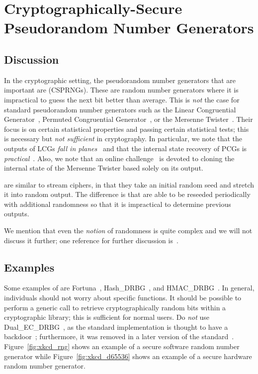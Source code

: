 \section{Cryptographically-Secure Pseudorandom Number Generators}
\label{sec:csprng}

\subsection{Discussion}

In the cryptographic setting, the pseudorandom number generators
that are important are
\emph{}
(CSPRNGs).
These are random number generators where it is impractical
to guess the next bit better than average.
This is \emph{not} the case for standard pseudorandom number generators
such as the Linear Congruential Generator~\cite[Chapter 3.2.1]{TAOCP2},
Permuted Congruential Generator~\cite{PCG2014},
or the Mersenne Twister~\cite{matsumoto1998mersenne}.
Their focus is on certain statistical properties and passing
certain statistical tests;
this is necessary but \emph{not sufficient} in cryptography.
In particular, we note that the outputs of LCGs
\emph{fall in planes}~\cite{marsaglia1968random}
and that the internal state recovery of PCGs
is \emph{practical}~\cite{bouillaguet2020practical}.
Also, we note that an online challenge~\cite{CryptoPals23}
is devoted to cloning the internal state of the Mersenne Twister
based solely on its output.

 are similar to \glspl{stream cipher}, in that they take
an initial random seed and stretch it into random output.
The difference is that  are able to be reseeded
periodically with additional randomness
so that it is impractical to determine previous outputs.

We mention that even the \emph{notion} of randomness is quite complex
and we will not discuss it further;
one reference for further discussion is~\cite[Chapter 3.5]{TAOCP2}.

\subsection{Examples}

Some examples of  are
Fortuna~\cite[Chapter 10]{PracticalCryptography}\cite[Chapter 9]{CryptoEng},
Hash\_DRBG~\cite[Section~10.1.1]{NIST-SP-800-90ARev1},
and HMAC\_DRBG~\cite[Section~10.1.2]{NIST-SP-800-90ARev1}.
In general, individuals should not worry about specific
 functions.
It should be possible to perform a generic call to retrieve
cryptographically random bits within a cryptographic library;
this is sufficient for normal users.
Do \emph{not} use Dual\_EC\_DRBG~\cite[Section~10.3.1]{NIST-SP-800-90A},
as the standard implementation
is thought to have a backdoor~\cite{BernsteinDualEC};
furthermore, it was removed in a later version
of the standard~\cite{NIST-SP-800-90ARev1}.
Figure~\ref{fig:xkcd_rng} shows an example of a
secure software random number generator
while Figure~\ref{fig:xkcd_d65536} shows an example of a
secure hardware random number generator.

